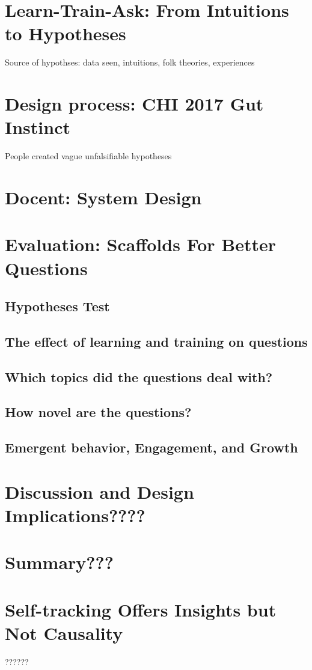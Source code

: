 \section{Learn-Train-Ask: From Intuitions to Hypotheses}
Source of hypothses: data seen, intuitions, folk theories, experiences
\section{Design process: CHI 2017 Gut Instinct}
People created vague unfalsifiable hypotheses

\section{Docent: System Design}
\section{Evaluation: Scaffolds For Better Questions}
 \subsection{Hypotheses Test}
 \subsection{The effect of learning and training on questions}
 \subsection{Which topics did the questions deal with?}
 \subsection{How novel are the questions?}
 \subsection{Emergent behavior, Engagement, and Growth}

\section{Discussion and Design Implications????}
\section{Summary???}

\section{Self-tracking Offers Insights but Not Causality}
??????

